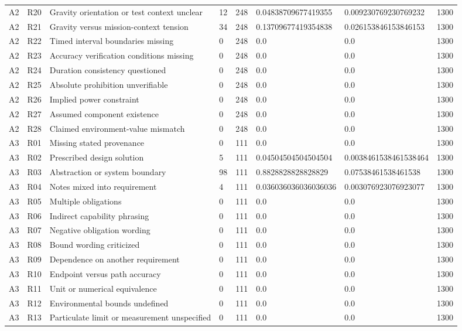 \begin{tabular}{llllllll}
A2 & R20 & Gravity orientation or test context unclear & 12 & 248 & 0.04838709677419355 & 0.009230769230769232 & 1300 \\
A2 & R21 & Gravity versus mission-context tension & 34 & 248 & 0.13709677419354838 & 0.026153846153846153 & 1300 \\
A2 & R22 & Timed interval boundaries missing & 0 & 248 & 0.0 & 0.0 & 1300 \\
A2 & R23 & Accuracy verification conditions missing & 0 & 248 & 0.0 & 0.0 & 1300 \\
A2 & R24 & Duration consistency questioned & 0 & 248 & 0.0 & 0.0 & 1300 \\
A2 & R25 & Absolute prohibition unverifiable & 0 & 248 & 0.0 & 0.0 & 1300 \\
A2 & R26 & Implied power constraint & 0 & 248 & 0.0 & 0.0 & 1300 \\
A2 & R27 & Assumed component existence & 0 & 248 & 0.0 & 0.0 & 1300 \\
A2 & R28 & Claimed environment-value mismatch & 0 & 248 & 0.0 & 0.0 & 1300 \\
A3 & R01 & Missing stated provenance & 0 & 111 & 0.0 & 0.0 & 1300 \\
A3 & R02 & Prescribed design solution & 5 & 111 & 0.04504504504504504 & 0.0038461538461538464 & 1300 \\
A3 & R03 & Abstraction or system boundary & 98 & 111 & 0.8828828828828829 & 0.07538461538461538 & 1300 \\
A3 & R04 & Notes mixed into requirement & 4 & 111 & 0.036036036036036036 & 0.003076923076923077 & 1300 \\
A3 & R05 & Multiple obligations & 0 & 111 & 0.0 & 0.0 & 1300 \\
A3 & R06 & Indirect capability phrasing & 0 & 111 & 0.0 & 0.0 & 1300 \\
A3 & R07 & Negative obligation wording & 0 & 111 & 0.0 & 0.0 & 1300 \\
A3 & R08 & Bound wording criticized & 0 & 111 & 0.0 & 0.0 & 1300 \\
A3 & R09 & Dependence on another requirement & 0 & 111 & 0.0 & 0.0 & 1300 \\
A3 & R10 & Endpoint versus path accuracy & 0 & 111 & 0.0 & 0.0 & 1300 \\
A3 & R11 & Unit or numerical equivalence & 0 & 111 & 0.0 & 0.0 & 1300 \\
A3 & R12 & Environmental bounds undefined & 0 & 111 & 0.0 & 0.0 & 1300 \\
A3 & R13 & Particulate limit or measurement unspecified & 0 & 111 & 0.0 & 0.0 & 1300 \\

\end{tabular}
